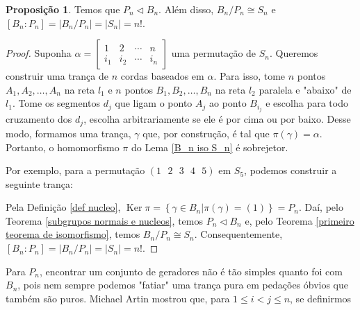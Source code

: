 \documentclass[a4paper,portuguese,11pt,twoside, leqno]{book}
\makeatletter
\DeclareMathOperator{\Ker}{Ker}
\newcounter{braid}
\newcounter{strands}
\def\cross{%
	\@ifnextchar^{\message{Got sup}\cross@sup}{\cross@sub}}
\def\cross@sup^#1_#2{\render@cross{#2}{#1}}
\def\cross@sub_#1{\@ifnextchar^{\cross@@sub{#1}}{\render@cross{#1}{1}}}
\def\cross@@sub#1^#2{\render@cross{#1}{#2}}
\def\render@cross#1#2{
	\def\strand{#1}
	\def\crossing{#2}
	\pgfmathsetmacro{\cross@y}{-\value{braid}*\braid@h}
	\pgfmathtruncatemacro{\nextstrand}{#1+1}
	\foreach \thread in {1,...,\value{strands}}
	{
		\pgfmathsetmacro{\strand@x}{\thread * \braid@w}
		\ifnum\thread=\strand
		\pgfmathsetmacro{\over@x}{\strand * \braid@w + .5*(1 - \crossing) * \braid@w}
		\pgfmathsetmacro{\under@x}{\strand * \braid@w + .5*(1 + \crossing) * \braid@w}
		\draw[braid] \pgfkeysvalueof{/tikz/braid start} +(\under@x pt,\cross@y pt) to[out=-90,in=90] +(\over@x pt,\cross@y pt -\braid@h);
		\draw[braid] \pgfkeysvalueof{/tikz/braid start} +(\over@x pt,\cross@y pt) to[out=-90,in=90] +(\under@x pt,\cross@y pt -\braid@h);
		\else
		\ifnum\thread=\nextstrand
		\else
		\draw[braid] \pgfkeysvalueof{/tikz/braid start} ++(\strand@x pt,\cross@y pt) -- ++(0,-\braid@h);
		\fi
		\fi
	}
	\stepcounter{braid}
}
\newcommand{\braid}[2][]{%
	\begingroup
	\pgfkeys{/tikz/strands=2}
	\tikzset{#1}
	\pgfkeysgetvalue{/tikz/braid width}{\braid@w}
	\pgfkeysgetvalue{/tikz/braid height}{\braid@h}
	\setcounter{braid}{0}
	\let\sigma=\cross
	#2
	\endgroup
}
\theoremstyle{definition}
\newtheorem{prop}{Proposição}[section]
\makeatother
\begin{document}
	\begin{prop}
		\label{P_n normal em B_n}
		Temos que $P_n\vartriangleleft B_n$. Além disso, $B_n/P_n \cong S_n$ e $[B_n:P_n] = |B_n/P_n| = |S_n| = n!$.
	\end{prop}
	
	\begin{proof}
		Suponha $\alpha = \begin{bmatrix}
		1 & 2 & \cdots & n \\
		i_1 & i_2 & \cdots & i_n
		\end{bmatrix}$ uma permutação de $S_n$. Queremos construir uma trança de $n$ cordas baseados em $\alpha$. Para isso, tome $n$ pontos $A_1, A_2, \dots, A_n$ na reta $l_1$ e $n$ pontos $B_1, B_2, \dots, B_n$ na reta $l_2$ paralela e "abaixo" de $l_1$. Tome os segmentos $d_j$ que ligam o ponto $A_j$ ao ponto $B_{i_j}$ e escolha para todo cruzamento dos $d_j$, escolha arbitrariamente se ele é por cima ou por baixo. Desse modo, formamos uma trança, $\gamma$ que, por construção, é tal que $\pi(\gamma) = \alpha$. Portanto, o homomorfismo $\pi$ do Lema \eqref{B_n iso S_n} é sobrejetor. 
		
		\par\vspace{0.3cm} Por exemplo, para a permutação $(1\text{ }2\text{ }3\text{ }4\text{ }5)$ em $S_5$, podemos construir a seguinte trança:
		\begin{center}
		\end{center}
		
		\par\vspace{0.3cm} Pela Definição \eqref{def nucleo}, $\Ker\pi = \left\{ \gamma\in B_n | \pi(\gamma) = (1) \right\} = P_n$. Daí, pelo Teorema \eqref{subgrupos normais e nucleos}, temos $P_n\triangleleft B_n$ e, pelo Teorema \eqref{primeiro teorema de isomorfismo}, temos $B_n/P_n\cong S_n$. Consequentemente, $[B_n:P_n] = |B_n/P_n| = |S_n| = n!$. 
		
	\end{proof}
	
	\par\vspace{0.3cm} Para $P_n$, encontrar um conjunto de geradores não é tão simples quanto foi com $B_n$, pois nem sempre podemos "fatiar" uma trança pura em pedações óbvios que também são puros. Michael Artin mostrou que, para $1\leq i<j\leq n$, se definirmos
	
\end{document}
